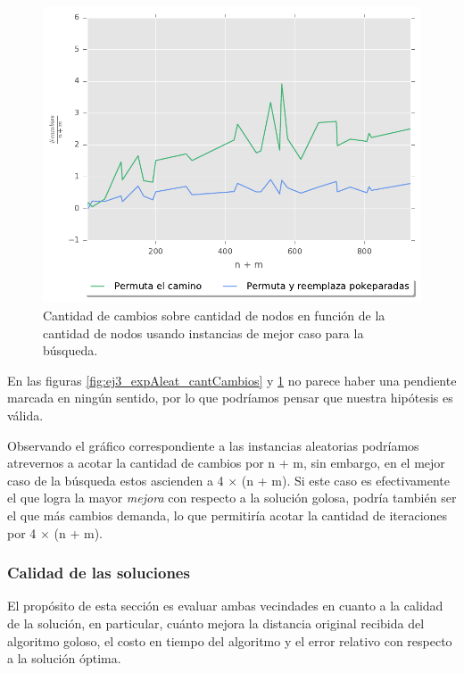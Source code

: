 \begin{figure}[H]
  \begin{center}
    \includegraphics{../experimentacion/ej3/expMejor_cantCambios.pdf}
    \caption{Cantidad de cambios sobre cantidad de nodos en funci\'on de la cantidad de nodos usando instancias de mejor caso para la b\'usqueda.}
    \label{fig:ej3_expMejor_cantCambios}
  \end{center}
\end{figure}

En las figuras \ref{fig:ej3_expAleat_cantCambios} y \ref{fig:ej3_expMejor_cantCambios} no parece haber una pendiente marcada en ning\'un sentido, por lo que podr\'iamos pensar que nuestra hip\'otesis es v\'alida.

Observando el gr\'afico correspondiente a las instancias aleatorias podr\'iamos atrevernos a acotar la cantidad de cambios por n + m, sin embargo, en el mejor caso de la b\'usqueda estos ascienden a 4 $\times$ (n + m). Si este caso es efectivamente el que logra la mayor \textit{mejora} con respecto a la soluci\'on golosa, podr\'ia tambi\'en ser el que m\'as cambios demanda, lo que permitir\'ia acotar la cantidad de iteraciones por 4 $\times$ (n + m).


\subsubsection{Calidad de las soluciones}

El prop\'osito de esta secci\'on es evaluar ambas vecindades en cuanto a la calidad de la soluci\'on, en particular, cu\'anto mejora la distancia original recibida del algoritmo goloso, el costo en tiempo del algoritmo y el error relativo con respecto a la soluci\'on \'optima.

